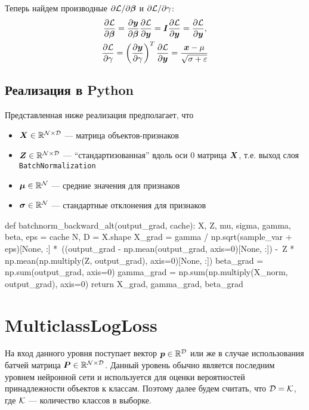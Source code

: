 \documentclass{report}
\numberwithin{theorem}{chapter}
\numberwithin{statement}{chapter}
\numberwithin{lemma}{chapter}
\theoremstyle{definition}
\numberwithin{task}{chapter}
\theoremstyle{remark}
\numberwithin{example}{chapter}
\theoremstyle{definition}
\numberwithin{definition}{chapter}
\theoremstyle{remark}
\theoremstyle{remark}
\numberwithin{lyrics}{section}
\begin{document}
Теперь найдем производные $\partial \mathcal{L} / \partial \boldsymbol{\beta}$ и $\partial \mathcal{L} / \partial \gamma$:
\begin{gather*}
\frac{\partial \mathcal{L} }{\partial \boldsymbol{\beta}} = \frac{\partial \boldsymbol{y} }{\partial \boldsymbol{\beta}} \frac{\partial \mathcal{L} }{\partial \boldsymbol{y}} = \boldsymbol{I} \frac{\partial \mathcal{L} }{\partial \boldsymbol{y}} = \frac{\partial \mathcal{L} }{\partial \boldsymbol{y}}, \\
\frac{\partial \mathcal{L} }{\partial \gamma} = \left(\frac{\partial \boldsymbol{y} }{\partial \gamma}\right)^T \frac{\partial \mathcal{L} }{\partial \boldsymbol{y}} = \frac{\boldsymbol{x} - \mu}{\sqrt{\sigma + \varepsilon}}
\end{gather*}

\subsection{Реализация в Python}

Представленная ниже реализация предполагает, что 
\begin{itemize}
	\item $\boldsymbol{X} \in \mathbb{R}^{\mathcal{N} \times \mathcal{D}}$ --- матрица объектов-признаков
	\item $\boldsymbol{Z} \in \mathbb{R}^{\mathcal{N} \times \mathcal{D}}$ --- ``стандартизованная'' вдоль оси 0 матрица $\boldsymbol{X}$, т.е. выход слоя \texttt{BatchNormalization}
	\item $\boldsymbol{\mu} \in \mathbb{R}^{\mathcal{N}}$ --- средние значения для признаков
	\item $\boldsymbol{\sigma} \in \mathbb{R}^{\mathcal{N}}$ --- стандартные отклонения для признаков
\end{itemize}

\begin{python}
def batchnorm_backward_alt(output_grad, cache):
  X, Z, mu, sigma, gamma, beta, eps = cache
  N, D = X.shape
  X_grad = gamma / np.sqrt(sample_var + eps)[None, :] *\ 
           ((output_grad - np.mean(output_grad, axis=0)[None, :]) -\
           Z * np.mean(np.multiply(Z, output_grad), axis=0)[None, :]) 
  beta_grad = np.sum(output_grad, axis=0)
  gamma_grad = np.sum(np.multiply(X_norm, output_grad), axis=0)
  return X_grad, gamma_grad, beta_grad
\end{python}

\section{MulticlassLogLoss}
На вход данного уровня поступает вектор $\boldsymbol{p} \in \mathbb{R}^{\mathcal{D}}$ или же в случае использования батчей матрица $\boldsymbol{P} \in \mathbb{R}^{\mathcal{N} \times \mathcal{D}}$. Данный уровень обычно является последним уровнем нейронной сети и используется для оценки вероятностей принадлежности объектов к классам. Поэтому далее будем считать, что $\mathcal{D} = \mathcal{K}$, где $\mathcal{K}$ --- количество классов в выборке.
\end{document}
